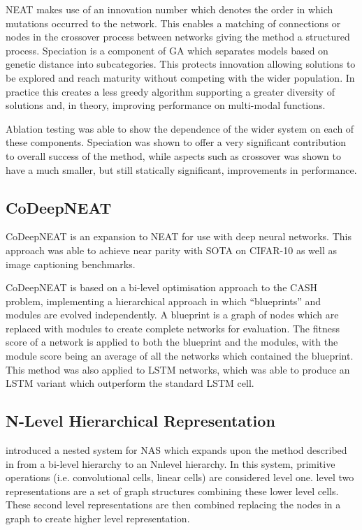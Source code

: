 \documentclass{article}
\begin{document}
		NEAT makes use of an innovation number which denotes the order in which mutations occurred to the network. This enables a matching of connections or nodes in the crossover process between networks giving the method a structured process. Speciation is a component of GA which separates models based on genetic distance into subcategories. This protects innovation allowing solutions to be explored and reach maturity without competing with the wider population. In practice this creates a less greedy algorithm supporting a greater diversity of solutions and, in theory, improving performance on multi-modal functions. 

		Ablation testing was able to show the dependence of the wider system on each of these components. Speciation was shown to offer a very significant contribution to overall success of the method, while aspects such as crossover was shown to have a much smaller, but still statically significant, improvements in performance.


	\subsection{CoDeepNEAT}

		CoDeepNEAT \cite{25} is an expansion to NEAT for use with deep neural networks. This approach was able to achieve near parity with SOTA on CIFAR-10 as well as image captioning benchmarks. 

		\par
		CoDeepNEAT is based on a bi-level optimisation approach to the CASH problem, implementing a hierarchical approach in which “blueprints” and modules are evolved independently. A blueprint is a graph of nodes which are replaced with modules to create complete networks for evaluation. The fitness score of a network is applied to both the blueprint and the modules, with the module score being an average of all the networks which contained the blueprint. This method was also applied to LSTM networks, which was able to produce an LSTM variant which outperform the standard LSTM cell.


	\subsection{N-Level Hierarchical Representation }

		\cite{4} introduced a nested system for NAS which expands upon the method described in \cite{25} from a bi-level hierarchy to an Nnlevel hierarchy. In this system, primitive operations (i.e. convolutional cells, linear cells) are considered level one. level two representations are a set of graph structures combining these lower level cells. These second level representations are then combined replacing the nodes in a graph to create higher level representation. 
\end{document}
